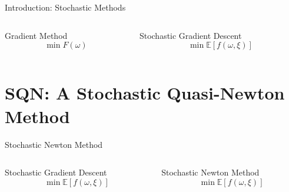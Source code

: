 \documentclass[10pt]{beamer}
\begin{document}
  \begin{frame}{Introduction: Stochastic Methods}
    \begin{columns}[T]
      \begin{column}{.5\textwidth}
        \centering \alert{Gradient Method}
        $$\min F(\omega) $$

      \end{column}\hfill
      \begin{column}{.5\textwidth}
        \centering \alert{Stochastic Gradient Descent}
        $$\min \mathbb E \left [f(\omega, \xi)\right]$$
      \end{column}
    \end{columns}
  \end{frame}

\section{SQN: A Stochastic Quasi-Newton Method}

 
  \begin{frame}{Stochastic Newton Method}
    \begin{columns}[T]
      \begin{column}{.5\textwidth}
        \centering \alert{Stochastic Gradient Descent}
        $$\min \mathbb E \left [f(\omega, \xi)\right]$$
      \end{column}\hfill
      \begin{column}{.5\textwidth}
        \centering \alert{Stochastic Newton Method}
        $$\min \mathbb E \left [f(\omega, \xi)\right]$$
      \end{column}
    \end{columns}
  \end{frame}
  
\end{document}
